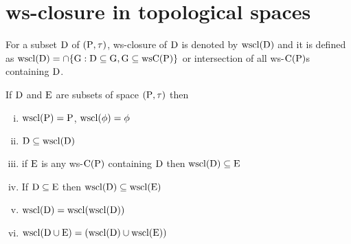 \section{ws-closure in topological spaces}\label{sec2.4}

\begin{dfn}\label{defi2.4.1} 
For a subset $\mathrm{D}$ of $(\mathrm{P}, \tau)$, ws-closure of $\mathrm{D}$ is denoted by $\mathrm{wscl}(\mathrm{D})$ and it is defined as $\mathrm{wscl}(\mathrm{D})=\cap \{\mathrm{G}: \mathrm{D}\subseteq \mathrm{G}, \mathrm{G}\subseteq \mathrm{ws}\mathrm{C}(\mathrm{P})\}$ or intersection of all ws-$\mathrm{C}(\mathrm{P})$s containing $\mathrm{D}$.
\end{dfn}

\begin{thm}\label{thm2.4.2}
If $\mathrm{D}$ and $\mathrm{E}$  are subsets of space $(\mathrm{P}, \tau)$ then
\begin{enumerate}[(i)]
\item $\mathrm{wscl}(\mathrm{P})=\mathrm{P}$, $\mathrm{wscl}(\phi)=\phi$
\item $\mathrm{D}\subseteq \mathrm{wscl}(\mathrm{D})$
\item if $\mathrm{E}$ is any ws-$\mathrm{C}(\mathrm{P})$ containing $\mathrm{D}$ then $\mathrm{wscl}(\mathrm{D})\subseteq \mathrm{E}$
\item If $\mathrm{D}\subseteq \mathrm{E}$ then $\mathrm{wscl}(\mathrm{D})\subseteq \mathrm{wscl}(\mathrm{E})$
\item $\mathrm{wscl}(\mathrm{D})=\mathrm{wscl}(\mathrm{wscl}(\mathrm{D}))$
\item $\mathrm{wscl}(\mathrm{D}\cup \mathrm{E})=(\mathrm{wscl}(\mathrm{D})\cup \mathrm{wscl}(\mathrm{E}))$
\end{enumerate}
\end{thm}

